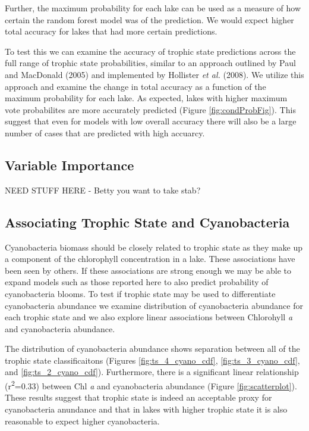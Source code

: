 \documentclass[11pt,]{article}
\begin{document}
Further, the maximum probability for each lake can be used as a measure
of how certain the random forest model was of the prediction. We would
expect higher total accuracy for lakes that had more certain
predictions.

To test this we can examine the accuracy of trophic state predictions
across the full range of trophic state probabilities, similar to an
approach outlined by Paul and MacDonald (2005) and implemented by
Hollister \emph{et al.} (2008). We utilize this approach and examine the
change in total accuracy as a function of the maximum probability for
each lake. As expected, lakes with higher maximum vote probabilites are
more accurately predicted (Figure \ref{fig:condProbFig}). This suggest
that even for models with low overall accuracy there will also be a
large number of cases that are predicted with high accuarcy.

\subsection{Variable Importance}\label{variable-importance}

NEED STUFF HERE - Betty you want to take stab?

\subsection{Associating Trophic State and
Cyanobacteria}\label{associating-trophic-state-and-cyanobacteria}

Cyanobacteria biomass should be closely related to trophic state as they
make up a component of the chlorophyll concentration in a lake. These
associations have been seen by others. If these associations are strong
enough we may be able to expand models such as those reported here to
also predict probability of cyanobacteria blooms. To test if trophic
state may be used to differentiate cyanobacteria abundance we examine
distribution of cyanobacteria abundance for each trophic state and we
also explore linear associations between Chlorohyll \emph{a} and
cyanobacteria abundance.

The distribution of cyanobacteria abundance shows separation between all
of the trophic state classificaitons (Figures \ref{fig:ts_4_cyano_cdf},
\ref{fig:ts_3_cyano_cdf}, and \ref{fig:ts_2_cyano_cdf}). Furthermore,
there is a significant linear relationship (r\textsuperscript{2}=0.33)
between Chl \emph{a} and cyanobacteria abundance (Figure
\ref{fig:scatterplot}). These results suggest that trophic state is
indeed an acceptable proxy for cyanobacteria anundance and that in lakes
with higher trophic state it is also reasonable to expect higher
cyanobacteria.
\end{document}
